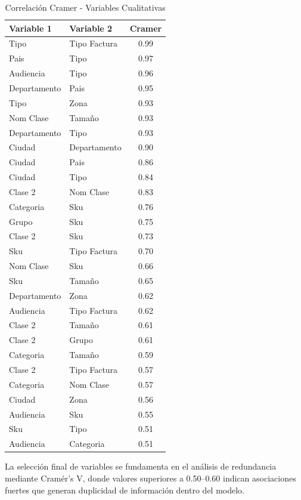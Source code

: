 \begin{table}[H]
\centering
\caption{Correlación Cramer - Variables Cualitativas}
\label{tab:corr_cualitativas}
\renewcommand{\arraystretch}{1.2}
\begin{tabular}{l l c} %
\hline
\textbf{Variable 1} & \textbf{Variable 2} & \textbf{Cramer} \\
\hline
Tipo & Tipo Factura & 0.99 \\ 
Pais & Tipo & 0.97 \\ 
Audiencia & Tipo & 0.96 \\
Departamento & Pais & 0.95 \\ 
Tipo & Zona & 0.93 \\ 
Nom Clase & Tamaño & 0.93 \\
Departamento & Tipo & 0.93 \\
Ciudad & Departamento & 0.90 \\
Ciudad & Pais & 0.86 \\ 
Ciudad & Tipo & 0.84 \\ 
Clase 2 & Nom Clase & 0.83 \\
Categoria & Sku & 0.76 \\  
Grupo & Sku & 0.75 \\ 
Clase 2 & Sku & 0.73 \\ 
Sku & Tipo Factura & 0.70 \\
Nom Clase & Sku & 0.66 \\ 
Sku & Tamaño & 0.65 \\ 
Departamento & Zona & 0.62 \\ 
Audiencia & Tipo Factura & 0.62 \\ 
Clase 2  & Tamaño & 0.61 \\ 
Clase 2  & Grupo & 0.61 \\ 
Categoria  & Tamaño & 0.59 \\ 
Clase 2  & Tipo Factura & 0.57 \\
Categoria  & Nom Clase & 0.57 \\
Ciudad  & Zona & 0.56 \\
Audiencia  & Sku & 0.55 \\
Sku  & Tipo & 0.51 \\
Audiencia  & Categoria & 0.51 \\
\hline
\end{tabular}
\end{table}

La selección final de variables se fundamenta en el análisis de redundancia mediante Cramér’s V, donde valores superiores a 0.50–0.60 indican asociaciones fuertes que generan duplicidad de información dentro del modelo. 

